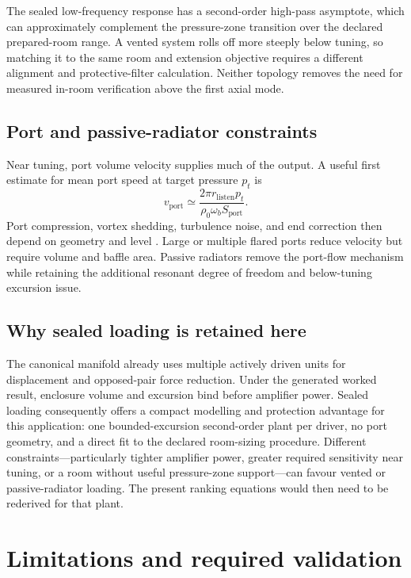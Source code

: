 \documentclass[11pt,a4paper]{article}
\numberwithin{equation}{section}
\begin{document}
The sealed low-frequency response has a second-order high-pass asymptote,
which can approximately complement the pressure-zone transition over the
declared prepared-room range.  A vented system rolls off more steeply below
tuning, so matching it to the same room and extension objective requires a
different alignment and protective-filter calculation.  Neither topology
removes the need for measured in-room verification above the first axial
mode.

\subsection{Port and passive-radiator constraints}

Near tuning, port volume velocity supplies much of the output.  A useful
first estimate for mean port speed at target pressure $p_t$ is
\begin{equation}
	v_{\mathrm{port}}\simeq
	\frac{2\pi r_{\mathrm{listen}}p_t}
	{\rho_0\omega_bS_{\mathrm{port}}}.
	\label{eq:portvelocity}
\end{equation}
Port compression, vortex shedding, turbulence noise, and end correction
then depend on geometry and level \cite{salvatti2002,vanderkooy1998}.
Large or multiple flared ports reduce velocity but require volume and baffle
area.  Passive radiators remove the port-flow mechanism while retaining the
additional resonant degree of freedom and below-tuning excursion issue.

\subsection{Why sealed loading is retained here}

The canonical manifold already uses multiple actively driven units for
displacement and opposed-pair force reduction.  Under the generated worked
result, enclosure volume and excursion bind before amplifier power.
Sealed loading consequently offers a compact modelling and protection
advantage for this application: one bounded-excursion second-order plant per
driver, no port geometry, and a direct fit to the declared room-sizing
procedure.  Different constraints---particularly tighter amplifier power,
greater required sensitivity near tuning, or a room without useful
pressure-zone support---can favour vented or passive-radiator loading.  The
present ranking equations would then need to be rederived for that plant.

\section{Limitations and required validation}
\label{sec:limits}
\end{document}
